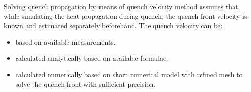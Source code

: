 Solving quench propagation by means of quench velocity method assumes that, while  simulating the heat propagation during quench, the quench front velocity is known and estimated separately beforehand. The quench velocity can be:
\begin{itemize}
\item based on available measurements,
\item calculated analytically based on available formulae,
\item calculated numerically based on short numerical model with refined mesh to solve the quench front with sufficient precision.
\end{itemize}